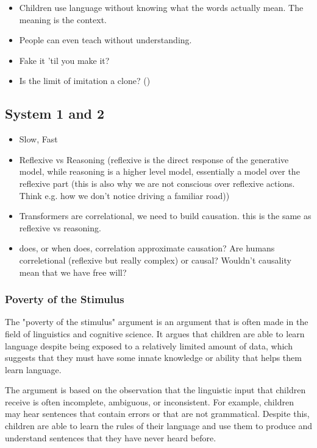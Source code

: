 \begin{itemize}
    \item Children use language without knowing what the words actually mean. The meaning is the context. 
    \item People can even teach without understanding. 
    \item Fake it 'til you make it?
    \item Is the limit of imitation a clone? ()
\end{itemize}

\subsection{System 1 and 2}

\begin{itemize}
    \item Slow, Fast
    \item Reflexive vs Reasoning (reflexive is the direct response of the generative model, while reasoning is a higher level model, essentially a model over the reflexive part (this is also why we are not conscious over reflexive actions. Think e.g. how we don't notice driving a familiar road))
    \item Transformers are correlational, we need to build causation. this is the same as reflexive vs reasoning.
    \item does, or when does, correlation approximate causation? Are humans correletional (reflexive but really complex) or causal? Wouldn't causality mean that we have free will?
\end{itemize}

\subsubsection{Poverty of the Stimulus}
The "poverty of the stimulus" argument is an argument that is often made in the field of linguistics and cognitive science. It argues that children are able to learn language despite being exposed to a relatively limited amount of data, which suggests that they must have some innate knowledge or ability that helps them learn language.

The argument is based on the observation that the linguistic input that children receive is often incomplete, ambiguous, or inconsistent. For example, children may hear sentences that contain errors or that are not grammatical. Despite this, children are able to learn the rules of their language and use them to produce and understand sentences that they have never heard before.

